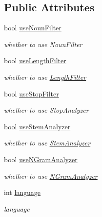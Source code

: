 \subsection*{Public Attributes}
\begin{CompactItemize}
\item 
bool \hyperlink{classla__manager_1_1LAConfiguration_9cca2d25b40c0104d0271a2a1403dcb7}{useNounFilter}
\begin{CompactList}\small\item\em whether to use NounFilter \item\end{CompactList}\item 
bool \hyperlink{classla__manager_1_1LAConfiguration_02c953de4f3db786e882ae7299b1afd0}{useLengthFilter}
\begin{CompactList}\small\item\em whether to use \hyperlink{classla__manager_1_1LengthFilter}{LengthFilter} \item\end{CompactList}\item 
bool \hyperlink{classla__manager_1_1LAConfiguration_0e7754360be451943a8bdb250205a203}{useStopFilter}
\begin{CompactList}\small\item\em whether to use StopAnalyzer \item\end{CompactList}\item 
bool \hyperlink{classla__manager_1_1LAConfiguration_931c1acb6d3c09c43fabc8c40cc40c7e}{useStemAnalyzer}
\begin{CompactList}\small\item\em whether to use \hyperlink{classla__manager_1_1StemAnalyzer}{StemAnalyzer} \item\end{CompactList}\item 
bool \hyperlink{classla__manager_1_1LAConfiguration_9f03faf2af4dfd1deaea622324a7b8b2}{useNGramAnalyzer}
\begin{CompactList}\small\item\em whether to use \hyperlink{classla__manager_1_1NGramAnalyzer}{NGramAnalyzer} \item\end{CompactList}\item 
int \hyperlink{classla__manager_1_1LAConfiguration_b1d895d5e5fefba04c6e45acb6fb8f2e}{language}
\begin{CompactList}\small\item\em language \item\end{CompactList}\item 

\end{CompactItemize}
